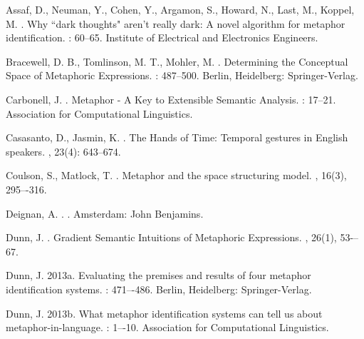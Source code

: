 \documentclass[11pt]{article}
\begin{document}
\begin{thebibliography}{}

Assaf, D., Neuman, Y., Cohen, Y., Argamon, S., Howard, N., Last, M., Koppel, M. 
.
\newblock Why ``dark thoughts" aren't really dark: A novel algorithm for metaphor identification. 
: 60--65. Institute of Electrical and Electronics Engineers.

Bracewell, D. B., Tomlinson, M. T., Mohler, M. 
.
\newblock Determining the Conceptual Space of Metaphoric Expressions.
: 487--500. Berlin, Heidelberg: Springer-Verlag.

Carbonell, J. 
.
\newblock Metaphor - A Key to Extensible Semantic Analysis.
: 17--21. Association for Computational Linguistics.

Casasanto, D., Jasmin, K. 
.
\newblock The Hands of Time: Temporal gestures in English speakers.
, 23(4): 643--674.

Coulson, S., Matlock, T. 
.
\newblock Metaphor and the space structuring model.
, 16(3), 295–-316.

Deignan, A. 
.
. 
\newblock Amsterdam: John Benjamins.

Dunn, J.
.
\newblock Gradient Semantic Intuitions of Metaphoric Expressions.
, 26(1), 53-–67.

Dunn, J. 
\newblock 2013a.
\newblock Evaluating the premises and results of four metaphor identification systems.
: 471–-486. Berlin, Heidelberg: Springer-Verlag.

Dunn, J. 
\newblock 2013b.
\newblock What metaphor identification systems can tell us about metaphor-in-language.
: 1–-10. Association for Computational Linguistics.


\end{thebibliography}
\end{document}
